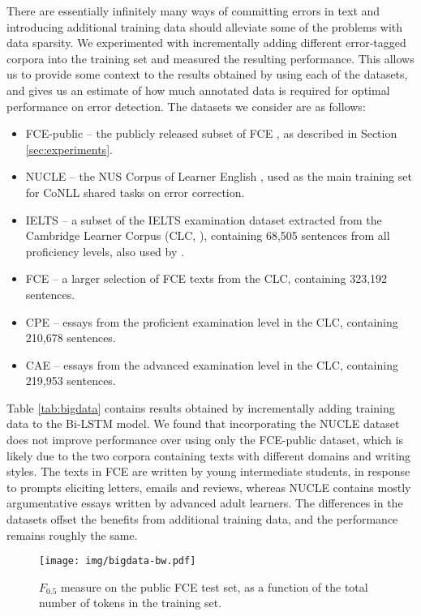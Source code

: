 \documentclass[11pt]{article}
\begin{document}
There are essentially infinitely many ways of committing errors in text and introducing additional training data should alleviate some of the problems with data sparsity. We experimented with incrementally adding different error-tagged corpora into the training set and measured the resulting performance. This allows us to provide some context to the results obtained by using each of the datasets, and gives us an estimate of how much annotated data is required for optimal performance on error detection.
The datasets we consider are as follows:

\begin{itemize}
\setlength\itemsep{-0.1em}
\item FCE-public -- the publicly released subset of FCE \cite{Yannakoudakis2011}, as described in Section \ref{sec:experiments}.
\item NUCLE -- the NUS Corpus of Learner English \cite{Dahlmeier2013}, used as the main training set for CoNLL shared tasks on error correction.
\item IELTS -- a subset of the IELTS examination dataset extracted from the Cambridge Learner Corpus (CLC, ), containing 68,505 sentences from all proficiency levels, also used by .
\item FCE -- a larger selection of FCE texts from the CLC, containing 323,192 sentences.
\item CPE -- essays from the proficient examination level in the CLC, containing 210,678 sentences.
\item CAE -- essays from the advanced examination level in the CLC, containing 219,953 sentences.

\end{itemize}


Table \ref{tab:bigdata} contains results obtained by incrementally adding training data to the Bi-LSTM model.
We found that incorporating the NUCLE dataset does not improve performance over using only the FCE-public dataset, which is likely due to the two corpora containing texts with different domains and writing styles.
The texts in FCE are written by young intermediate students, in response to prompts eliciting letters, emails and reviews, whereas NUCLE contains mostly argumentative essays written by advanced adult learners.
The differences in the datasets offset the benefits from additional training data, and the performance remains roughly the same.

\begin{figure}[h]
	\texttt{[image: img/bigdata-bw.pdf]}
	\caption{$F_{0.5}$ measure on the public FCE test set, as a function of the total number of tokens in the training set.}
	\label{fig:bigdata}
\end{figure}
\end{document}
